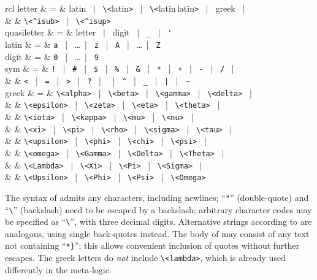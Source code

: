 \begin{isabellebody}
\begin{isamarkuptext}
\begin{matharray}{rcl}
    letter & = & latin ~|~ \verb,\,\verb,<,latin\verb,>, ~|~ \verb,\,\verb,<,latin\,latin\verb,>, ~|~ greek ~|~ \\
           &   & \verb,\<^isub>, ~|~ \verb,\<^isup>, \\
    quasiletter & = & letter ~|~ digit ~|~ \verb,_, ~|~ \verb,', \\
    latin & = & \verb,a, ~|~ \dots ~|~ \verb,z, ~|~ \verb,A, ~|~ \dots ~|~ \verb,Z, \\
    digit & = & \verb,0, ~|~ \dots ~|~ \verb,9, \\
    sym & = & \verb,!, ~|~ \verb,#, ~|~ \verb,$, ~|~ \verb,%, ~|~ \verb,&, ~|~
     \verb,*, ~|~ \verb,+, ~|~ \verb,-, ~|~ \verb,/, ~|~ \\
    & & \verb,<, ~|~ \verb,=, ~|~ \verb,>, ~|~ \verb,?, ~|~ \texttt{\at} ~|~
    \verb,^, ~|~ \verb,_, ~|~ \verb,|, ~|~ \verb,~, \\
    greek & = & \verb,\<alpha>, ~|~ \verb,\<beta>, ~|~ \verb,\<gamma>, ~|~ \verb,\<delta>, ~| \\
          &   & \verb,\<epsilon>, ~|~ \verb,\<zeta>, ~|~ \verb,\<eta>, ~|~ \verb,\<theta>, ~| \\
          &   & \verb,\<iota>, ~|~ \verb,\<kappa>, ~|~ \verb,\<mu>, ~|~ \verb,\<nu>, ~| \\
          &   & \verb,\<xi>, ~|~ \verb,\<pi>, ~|~ \verb,\<rho>, ~|~ \verb,\<sigma>, ~|~ \verb,\<tau>, ~| \\
          &   & \verb,\<upsilon>, ~|~ \verb,\<phi>, ~|~ \verb,\<chi>, ~|~ \verb,\<psi>, ~| \\
          &   & \verb,\<omega>, ~|~ \verb,\<Gamma>, ~|~ \verb,\<Delta>, ~|~ \verb,\<Theta>, ~| \\
          &   & \verb,\<Lambda>, ~|~ \verb,\<Xi>, ~|~ \verb,\<Pi>, ~|~ \verb,\<Sigma>, ~| \\
          &   & \verb,\<Upsilon>, ~|~ \verb,\<Phi>, ~|~ \verb,\<Psi>, ~|~ \verb,\<Omega>, \\
  \end{matharray}

  The syntax of  admits any characters, including
  newlines; ``\verb|"|'' (double-quote) and ``\verb|\|'' (backslash) need to be escaped by a backslash; arbitrary
  character codes may be specified as ``\verb|\|'',
  with three decimal digits.  Alternative strings according to
   are analogous, using single back-quotes instead.
  The body of  may consist of any text not
  containing ``\verb|*|\verb|}|''; this allows
  convenient inclusion of quotes without further escapes.  The greek
  letters do \emph{not} include \verb|\<lambda>|, which is already used
  differently in the meta-logic.


\end{isamarkuptext}
\end{isabellebody}
